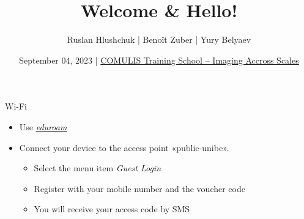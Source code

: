 \documentclass[aspectratio=169]{beamer}
\title{Welcome \& Hello!}
\author{Ruslan Hlushchuk | Benoît Zuber | Yury Belyaev}
\institute{Institute of Anatomy\\University of Bern\\Switzerland}
\date{September 04, 2023 | \href{https://www.ana.unibe.ch/continuing_education/comulis_training_school/}{COMULIS Training School -- Imaging Accross Scales}}
\begin{document}
{%
	\begin{frame}%
		\maketitle
	\end{frame}%
}

\begin{frame}{Wi-Fi}
	\begin{itemize}
		\item Use \emph{\href{https://www.eduroam.org/}{eduroam}}
		\item Connect your device to the access point «public-unibe».
		\begin{itemize}
			\item Select the menu item \emph{Guest Login}
			\item Register with your mobile number and the voucher code
			\begin{tcolorbox}[width=3.3cm,colframe=ubRed,colback=ubGrey,halign=center,halign title=center,title=Voucher code]
				
			\end{tcolorbox}
			\item You will receive your access code by SMS
		\end{itemize}
	\end{itemize}
\end{frame}
\end{document}

